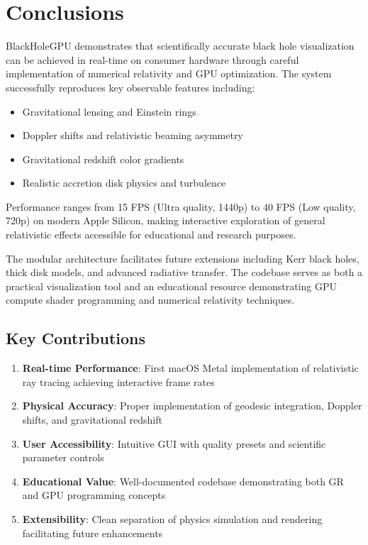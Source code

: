 \documentclass[12pt,a4paper]{article}
\theoremstyle{definition}
\theoremstyle{remark}
\begin{document}
\section{Conclusions}

BlackHoleGPU demonstrates that scientifically accurate black hole visualization can be achieved in real-time on consumer hardware through careful implementation of numerical relativity and GPU optimization. The system successfully reproduces key observable features including:

\begin{itemize}
    \item Gravitational lensing and Einstein rings
    \item Doppler shifts and relativistic beaming asymmetry
    \item Gravitational redshift color gradients
    \item Realistic accretion disk physics and turbulence
\end{itemize}

Performance ranges from 15 FPS (Ultra quality, 1440p) to 40 FPS (Low quality, 720p) on modern Apple Silicon, making interactive exploration of general relativistic effects accessible for educational and research purposes.

The modular architecture facilitates future extensions including Kerr black holes, thick disk models, and advanced radiative transfer. The codebase serves as both a practical visualization tool and an educational resource demonstrating GPU compute shader programming and numerical relativity techniques.

\subsection{Key Contributions}

\begin{enumerate}
    \item \textbf{Real-time Performance}: First macOS Metal implementation of relativistic ray tracing achieving interactive frame rates
    \item \textbf{Physical Accuracy}: Proper implementation of geodesic integration, Doppler shifts, and gravitational redshift
    \item \textbf{User Accessibility}: Intuitive GUI with quality presets and scientific parameter controls
    \item \textbf{Educational Value}: Well-documented codebase demonstrating both GR and GPU programming concepts
    \item \textbf{Extensibility}: Clean separation of physics simulation and rendering facilitating future enhancements
\end{enumerate}
\end{document}
